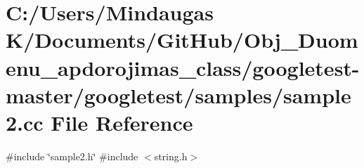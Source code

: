 \hypertarget{googletest-master_2googletest_2samples_2sample2_8cc}{}\section{C\+:/\+Users/\+Mindaugas K/\+Documents/\+Git\+Hub/\+Obj\+\_\+\+Duomenu\+\_\+apdorojimas\+\_\+class/googletest-\/master/googletest/samples/sample2.cc File Reference}
\label{googletest-master_2googletest_2samples_2sample2_8cc}
{\ttfamily \#include \char`\"{}sample2.\+h\char`\"{}}\newline
{\ttfamily \#include $<$string.\+h$>$}\newline
